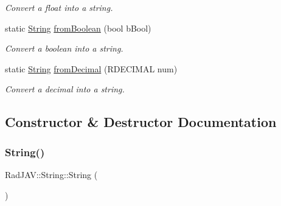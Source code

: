 \begin{DoxyCompactItemize}
\begin{DoxyCompactList}\small\item\em Convert a float into a string. \end{DoxyCompactList}\item 
static \mbox{\hyperlink{class_rad_j_a_v_1_1_string}{String}} \mbox{\hyperlink{class_rad_j_a_v_1_1_string_a169239aca74c7cb7fcee2f80cf868f62}{from\+Boolean}} (bool b\+Bool)
\begin{DoxyCompactList}\small\item\em Convert a boolean into a string. \end{DoxyCompactList}\item 
static \mbox{\hyperlink{class_rad_j_a_v_1_1_string}{String}} \mbox{\hyperlink{class_rad_j_a_v_1_1_string_a961d271c79d33f7700e980e6ef6e5b8b}{from\+Decimal}} (R\+D\+E\+C\+I\+M\+AL num)
\begin{DoxyCompactList}\small\item\em Convert a decimal into a string. \end{DoxyCompactList}\end{DoxyCompactItemize}


\subsection{Constructor \& Destructor Documentation}
\mbox{\label{class_rad_j_a_v_1_1_string_a985090598133e2119dce64b79b176250}} 
\subsubsection{\texorpdfstring{String()}{String()}\hspace{0.1cm}{\footnotesize\ttfamily [1/9]}}
{\footnotesize\ttfamily Rad\+J\+A\+V\+::\+String\+::\+String (\begin{DoxyParamCaption}{ }\end{DoxyParamCaption})\hspace{0.3cm}{\ttfamily [inline]}}

\mbox{\label{class_rad_j_a_v_1_1_string_ab80c5e67a1b9c5bd24e75abfa0c8c77e}} 
